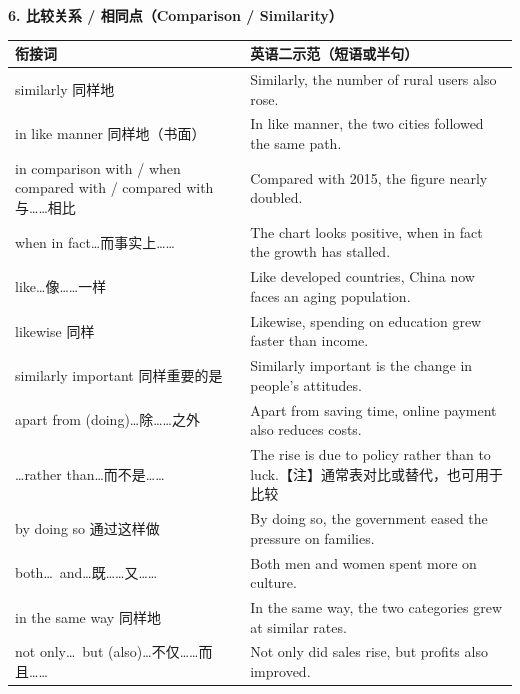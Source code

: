 \documentclass[11pt,a4paper]{ctexart}
\begin{document}
\par\addvspace{6pt}\noindent\textbf{6. 比较关系 / 相同点（Comparison / Similarity）}\par\addvspace{2pt}
\begin{longtable}{L{5.4cm}L{10.6cm}}
\toprule
\textbf{衔接词} & \textbf{英语二示范（短语或半句）} \\
\midrule
\endhead
similarly 同样地 & Similarly, the number of rural users also rose. \\
in like manner 同样地（书面） & In like manner, the two cities followed the same path. \\
in comparison with / when compared with / compared with 与……相比 & Compared with 2015, the figure nearly doubled. \\
when in fact\ldots 而事实上…… & The chart looks positive, when in fact the growth has stalled. \\
like\ldots 像……一样 & Like developed countries, China now faces an aging population. \\
likewise 同样 & Likewise, spending on education grew faster than income. \\
similarly important 同样重要的是 & Similarly important is the change in people's attitudes. \\
apart from (doing)\ldots 除……之外 & Apart from saving time, online payment also reduces costs. \\
\ldots rather than\ldots 而不是…… & The rise is due to policy rather than to luck.【注】通常表对比或替代，也可用于比较 \\
by doing so 通过这样做 & By doing so, the government eased the pressure on families. \\
both\ldots\ and\ldots 既……又…… & Both men and women spent more on culture. \\
in the same way 同样地 & In the same way, the two categories grew at similar rates. \\
not only\ldots\ but (also)\ldots 不仅……而且…… & Not only did sales rise, but profits also improved. \\
\bottomrule
\end{longtable}
\end{document}
